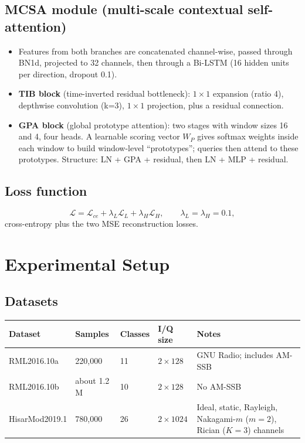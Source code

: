 \documentclass[11pt,a4paper]{article}
\begin{document}
\subsection{MCSA module (multi-scale contextual self-attention)}

\begin{itemize}
  \item Features from both branches are concatenated channel-wise, passed through BN1d, projected to 32 channels, then through a Bi-LSTM (16 hidden units per direction, dropout 0.1).
  \item \textbf{TIB block} (time-inverted residual bottleneck): $1\times1$ expansion (ratio 4), depthwise convolution (k=3), $1\times1$ projection, plus a residual connection.
  \item \textbf{GPA block} (global prototype attention): two stages with window sizes 16 and 4, four heads. A learnable scoring vector $W_P$ gives softmax weights inside each window to build window-level ``prototypes''; queries then attend to these prototypes. Structure: LN + GPA + residual, then LN + MLP + residual.
\end{itemize}

\subsection{Loss function}

\[ \mathcal{L} = \mathcal{L}_{ce} + \lambda_L \mathcal{L}_L + \lambda_H \mathcal{L}_H, \qquad \lambda_L = \lambda_H = 0.1, \]
cross-entropy plus the two MSE reconstruction losses.

\section{Experimental Setup}

\subsection{Datasets}

\begin{center}
\small
\begin{tabular}{llllp{5cm}}
\toprule
Dataset & Samples & Classes & I/Q size & Notes \\
\midrule
RML2016.10a & 220,000 & 11 & $2\times128$ & GNU Radio; includes AM-SSB \\
RML2016.10b & about 1.2 M & 10 & $2\times128$ & No AM-SSB \\
HisarMod2019.1 & 780,000 & 26 & $2\times1024$ & Ideal, static, Rayleigh, Nakagami-$m$ ($m=2$), Rician ($K=3$) channels \\
\bottomrule
\end{tabular}
\end{center}
\end{document}
